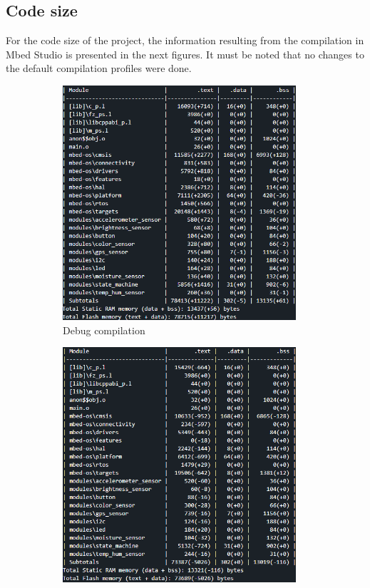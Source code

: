 \subsection{Code size}
For the code size of the project, the information resulting from the compilation in Mbed Studio is presented in the next figures. It must be noted that no changes to the default compilation profiles were done.
\begin{figure}[H]
    \centering
    \begin{subfigure}[t]{0.45\textwidth}
        \centering
        \includegraphics[width=0.95\textwidth]{images/4/Debug.png}
        \caption{Debug compilation}
    \end{subfigure}
    \begin{subfigure}[t]{0.45\textwidth}
        \centering
        \includegraphics[width=0.95\textwidth]{images/4/Develop.png}

\end{subfigure}
\end{figure}
